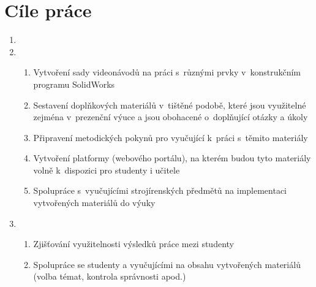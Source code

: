 \chapter{Cíle práce}

\begin{enumerate}[topsep=0pt]
    \setlength\itemsep{0em}
    \item {}
    
    \item {}
    \begin{enumerate}[topsep=0pt]
        \setlength\itemsep{0em}
        \item Vytvoření sady videonávodů na práci s~různými prvky v~konstrukčním programu SolidWorks
        \item Sestavení doplňkových materiálů v~tištěné podobě, které jsou využitelné zejména v~prezenční výuce a jsou obohacené o~doplňující otázky a úkoly
        \item Připravení metodických pokynů pro vyučující k~práci s~těmito materiály
        \item Vytvoření platformy (webového portálu), na kterém budou tyto materiály volně k~dispozici pro studenty i učitele
        \item Spolupráce s~vyučujícími strojírenských předmětů na implementaci vytvořených materiálů do výuky
    \end{enumerate}

    \item {}
    \begin{enumerate}[topsep=0pt]
        \setlength\itemsep{0em}
        \item Zjišťování využitelnosti výsledků práce mezi studenty 
        \item Spolupráce se studenty a vyučujícími na obsahu vytvořených materiálů (volba témat, kontrola správnosti apod.) 
    \end{enumerate}
\end{enumerate}

